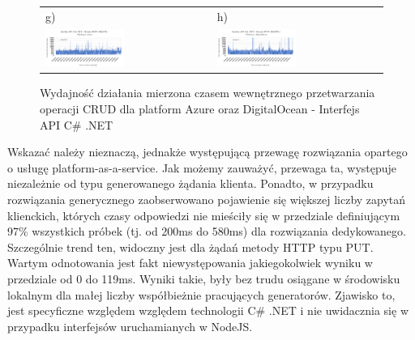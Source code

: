 \begin{figure}[htb]
\begin{tabular}{@{}ll@{}}
    g) & h) \\
    \includegraphics[width=0.49\textwidth]{rys05/dotnet-delete-azure.pdf} & \includegraphics[width=0.49\textwidth]{rys05/dotnet-delete-digitalocean.pdf} \\
	\end{tabular}
  \caption{Wydajność działania mierzona czasem wewnętrznego przetwarzania operacji CRUD dla platform Azure oraz DigitalOcean - Interfejs API C\# .NET}
  \label{fig:dotnet-azure-vs-digitalocean}
\end{figure}

Wskazać należy nieznaczą, jednakże występującą przewagę rozwiązania opartego o usługę platform-as-a-service. Jak możemy zauważyć, przewaga ta, występuje niezależnie od typu generowanego żądania klienta. Ponadto, w przypadku rozwiązania generycznego zaobserwowano pojawienie się większej liczby zapytań klienckich, których czasy odpowiedzi nie mieściły się w przedziale definiującym 97\% wszystkich próbek (tj. od 200ms do 580ms) dla rozwiązania dedykowanego. Szczególnie trend ten, widoczny jest dla żądań metody HTTP typu PUT. Wartym odnotowania jest fakt niewystępowania jakiegokolwiek wyniku w przedziale od 0 do 119ms. Wyniki takie, były bez trudu osiągane w środowisku lokalnym dla małej liczby współbieżnie pracujących generatorów. Zjawisko to, jest specyficzne względem względem technologii C\# .NET i nie uwidacznia się w przypadku interfejsów uruchamianych w NodeJS.

